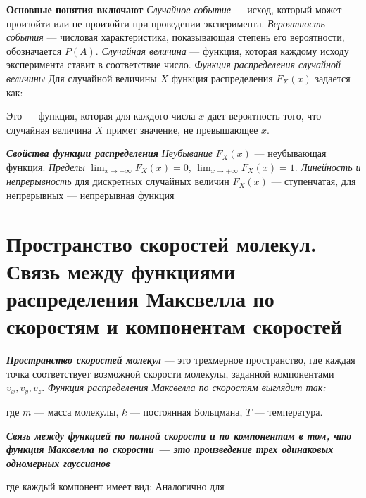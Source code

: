 \documentclass[14pt]{article}
\begin{document}
\textbf{Основные понятия включают} 
\newline \textit{Случайное событие} — исход, который может произойти или не произойти при проведении эксперимента. 
\newline \textit{Вероятность события} — числовая характеристика, показывающая степень его вероятности, обозначается \(P(A)\). 
\newline \textit{Случайная величина} — функция, которая каждому исходу эксперимента ставит в соответствие число. 
\newline \textit{Функция распределения случайной величины} Для случайной величины \(X\) функция распределения \(F_X(x)\) задается как: 
\begin{center}
    \big[\[ F_X(x) = P(X \leq x) \]\big]
    Это — функция, которая для каждого числа \(x\) дает вероятность того, что случайная величина \(X\) примет значение, не превышающее \(x\).
\end{center}


\textbf{\textit{Свойства функции распределения}} 
\newline \textit{Неубывание} \(F_X(x)\) — неубывающая функция. 
\newline \textit{Пределы} \(\lim_{x \to -\infty} F_X(x) = 0\), \(\lim_{x \to +\infty} F_X(x) = 1\). 
\newline \textit{Линейность и непрерывность} для дискретных случайных величин \(F_X(x)\) — ступенчатая, для непрерывных — непрерывная функция


\section{Пространство скоростей молекул. Связь между функциями распределения Максвелла по скоростям и компонентам скоростей}

\textbf{\textit{Пространство скоростей молекул}}
\newline — это трехмерное пространство, где каждая точка соответствует возможной скорости молекулы, заданной компонентами \(v_x, v_y, v_z\).
\newline \textit{Функция распределения Максвелла по скоростям выглядит так:}
\begin{center}
    \big[\[ f(\vec{v}) = \left(\frac{m}{2\pi k T}\right)^{3/2} \exp\left(-\frac{m(v_x^2 + v_y^2 + v_z^2)}{2k T}\right) \]\big]
    где \(m\) — масса молекулы, \(k\) — постоянная Больцмана, \(T\) — температура.
\end{center}

\textbf{\textit{Связь между функцией по полной скорости и по компонентам в том, что функция Максвелла по скорости — это произведение трех одинаковых одномерных гауссианов}}
\begin{center}
    \big[\[ f(\vec{v}) = f_x(v_x) \times f_y(v_y) \times f_z(v_z) \] \big]
    где каждый компонент имеет вид:
    \big[\[ f_x(v_x) = \left(\frac{m}{2\pi k T}\right)^{1/2} \exp\left(-\frac{m v_x^2}{2k T}\right) \]\big]
    Аналогично для
    \big[\(f_y(v_y)\) и \(f_z(v_z)\).\big]
\end{center}
\end{document}
